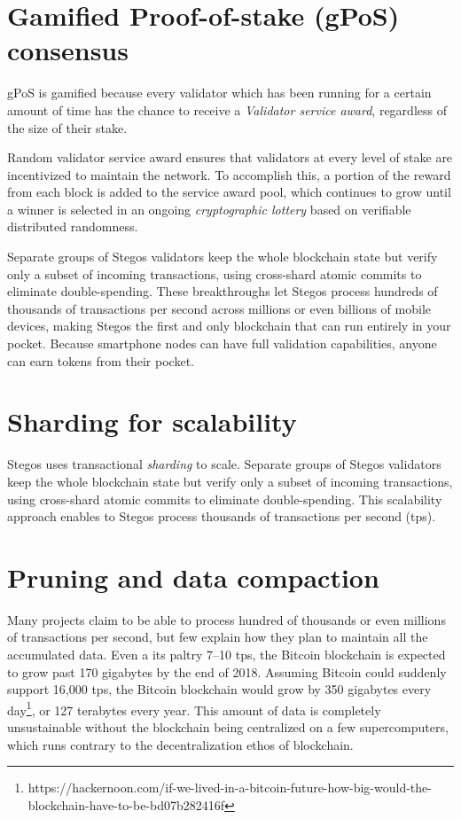 \documentclass[8pt,fleqn,openany]{book}
\begin{document}
\section{Gamified Proof-of-stake (gPoS) consensus}
gPoS is gamified because every validator which has been running for a certain amount of time has the chance to receive a \textit{Validator service award}, regardless of the size of their stake\footnotemark.


Random validator service award ensures that validators at every level of stake are incentivized to maintain the network. To accomplish this, a portion of the reward from each block is added to the service award pool, which continues to grow until a winner is selected in an ongoing \textit{cryptographic lottery} based on verifiable distributed randomness. 

Separate groups of Stegos validators keep the whole blockchain state but verify only a subset of incoming transactions, using cross-shard atomic commits to eliminate double-spending. These breakthroughs let Stegos process hundreds of thousands of transactions per second across millions or even billions of mobile devices, making Stegos the first and only blockchain that can run entirely in your pocket. Because smartphone nodes can have full validation capabilities, anyone can earn tokens from their pocket.

\section{Sharding for scalability}
Stegos uses transactional \textit{sharding} to scale. Separate groups of Stegos validators keep the whole blockchain state but verify only a subset of incoming transactions, using cross-shard atomic commits to eliminate double-spending. This scalability approach enables to Stegos process thousands of transactions per second (tps).

\section{Pruning and data compaction}
Many projects claim to be able to process hundred of thousands or even millions of transactions per second, but few explain how they plan to maintain all the accumulated data. Even a its paltry 7--10 tps, the Bitcoin blockchain is expected to grow past 170 gigabytes by the end of 2018. Assuming Bitcoin could suddenly support 16,000 tps, the Bitcoin blockchain would grow by 350 gigabytes every day\footnote{https://hackernoon.com/if-we-lived-in-a-bitcoin-future-how-big-would-the-blockchain-have-to-be-bd07b282416f}, or 127 terabytes every year. This amount of data is completely unsustainable without the blockchain being centralized on a few supercomputers, which runs contrary to the decentralization ethos of blockchain.
\end{document}
